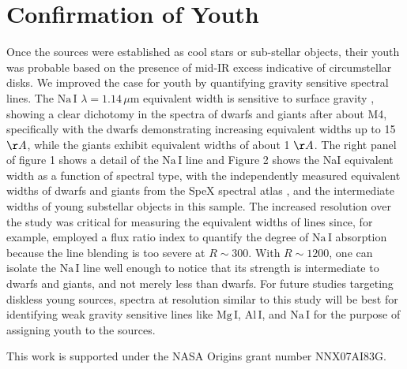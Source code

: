 \documentclass[11pt,twoside]{article}
\begin{document}
\section{Confirmation of Youth}
Once the sources were established as cool stars or sub-stellar objects, their youth was probable based on the presence of mid-IR excess \citep{allers06} indicative of circumstellar disks.  We improved the case for youth by quantifying gravity sensitive spectral lines.  The $\mathrm{Na\, I}$ $\lambda=1.14 \,\mu$m equivalent width is sensitive to surface gravity \citep{rayner09}, showing a clear dichotomy in the spectra of dwarfs and giants after about M4, specifically with the dwarfs demonstrating increasing equivalent widths up to 15 $\AA$, while the giants exhibit equivalent widths of about 1 $\AA$.  The right panel of figure 1 shows a detail of the  $\mathrm{Na\, I}$ line and Figure 2 shows the NaI equivalent width as a function of spectral type, with the independently measured equivalent widths of dwarfs and giants from the SpeX spectral atlas \citep{rayner09, cushing05}, and the intermediate widths of young substellar objects in this sample.  The increased resolution over the \citet{allers07} study was critical for measuring the equivalent widths of lines since, for example, \citet{allers07} employed a flux ratio index to quantify the degree of $\mathrm{Na\, I}$ absorption because the line blending is too severe at $R\sim$300.  With $R\sim1200$, one can isolate the $\mathrm{Na\, I}$ line well enough to notice that its strength is intermediate to dwarfs and giants, and not merely less than dwarfs.  For future studies targeting diskless young sources, spectra at resolution similar to this study will be best for identifying weak gravity sensitive lines like $\mathrm{Mg\, I}$, $\mathrm{Al\, I}$, and $\mathrm{Na\, I}$ \citep{rayner09} for the purpose of assigning youth to the sources.  



\acknowledgements This work is supported under the NASA Origins grant number NNX07AI83G.  


\end{document}
